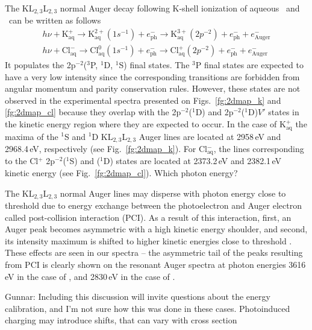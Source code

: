 The KL$_{2,3}$L$_{2,3}$ normal Auger decay following K-shell ionization of aqueous \ki~and \cli~can be written as follows
%
\begin{align*}
h\nu + \text{K}^{+}_{\text{aq}} \rightarrow 
	\text{K}^{2+}_{\text{aq}} (1s^{-1}) + e^{-}_{\text{ph}}\rightarrow
	\text{K}^{3+}_{\text{aq}} (2p^{-2}) + e^{-}_{\text{ph}} + e^{-}_{\text{Auger}}\\
h\nu + \text{Cl}^{-}_{\text{aq}} \rightarrow
	\text{Cl}^{0}_{\text{aq}} (1s^{-1}) + e^{-}_{\text{ph}}\rightarrow
	\text{Cl}^{+}_{\text{aq}}(2p^{-2}) + e^{-}_{\text{ph}} + e^{-}_{\text{Auger}}
\end{align*}
%
It populates the 2p$^{-2}$($^3$P, $^1$D, $^1$S) final states. The $^3$P final states are expected to have a very low intensity since the corresponding transitions are forbidden from angular momentum and parity conservation rules. However, these states are not observed in the experimental spectra presented on Figs.\ \ref{fg:2dmap_k} and \ref{fg:2dmap_cl} because they overlap with the 2p$^{-2}$($^1$D) and 2p$^{-2}$($^1$D)$V'$ states in the kinetic energy region where they are expected to occur. In the case of K$^{+}_{\text{aq}}$ the maxima of the $^1$S and $^1$D KL$_{2,3}$L$_{2,3}$ Auger lines are located at 2958\,eV and 2968.4\,eV, respectively (see Fig.\ \ref{fg:2dmap_k}). For Cl$^{-}_{\text{aq}}$, the lines corresponding to the Cl$^{+}$ 2p$^{-2}$($^1$S) and ($^1$D) states are located at 2373.2\,eV and 2382.1\,eV kinetic energy (see Fig.\ \ref{fg:2dmap_cl}). {\color{red}Which photon energy?}


The KL$_{2,3}$L$_{2,3}$ normal Auger lines may disperse with photon energy close to threshold due to energy exchange between the photoelectron and Auger electron called post-collision interaction (PCI). As a result of this interaction, first, an Auger peak becomes asymmetric with a high kinetic energy shoulder, and second, its intensity maximum is shifted to higher kinetic energies close to threshold \citep{russek86:911,guillemin15:012503}. These effects are seen in our spectra -- the asymmetric tail of the peaks resulting from PCI is clearly shown on the resonant Auger spectra at photon energies 3616\,eV in the case of \ki, and 2830\,eV in the case of \cli.


{\color{red}Gunnar: Including this discussion will invite questions about the energy calibration, and I’m not sure how this was done in these cases. Photoinduced charging may introduce shifts, that can vary with cross section}

